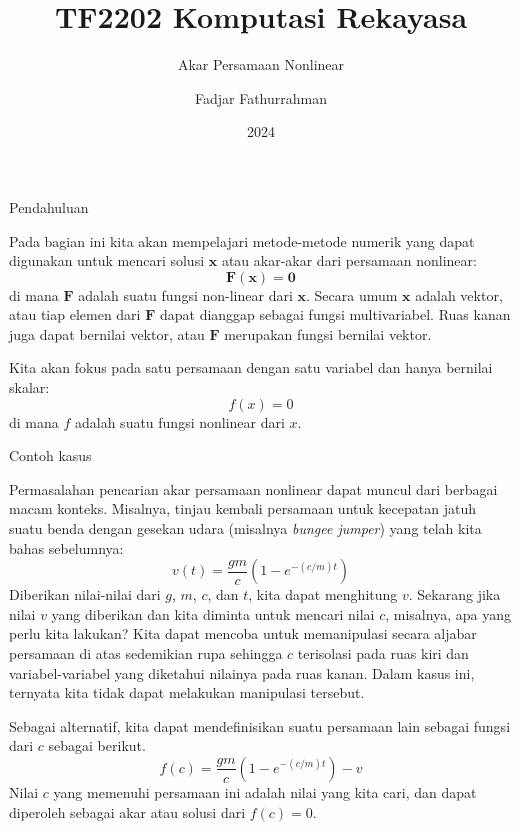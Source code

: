 

\title{TF2202 Komputasi Rekayasa}
\subtitle{Akar Persamaan Nonlinear}
\author{Fadjar Fathurrahman}
\date{2024}



\frame{\titlepage}

\begin{frame}{Pendahuluan}

Pada bagian ini kita akan mempelajari metode-metode numerik yang
dapat digunakan untuk mencari solusi $\mathbf{x}$ atau akar-akar
dari persamaan nonlinear:
$$
\mathbf{F}(\mathbf{x}) = \mathbf{0}
$$
di mana $\mathbf{F}$ adalah suatu fungsi non-linear dari $\mathbf{x}$.
Secara umum $\mathbf{x}$ adalah vektor, atau tiap elemen dari
$\mathbf{F}$ dapat dianggap sebagai
fungsi multivariabel. Ruas kanan juga dapat bernilai vektor, atau
$\mathbf{F}$ merupakan fungsi bernilai vektor.

Kita akan fokus pada satu persamaan dengan satu variabel dan hanya
bernilai skalar:
\begin{equation}
f(x) = 0
\label{eq:fx0}
\end{equation}
di mana $f$ adalah suatu fungsi nonlinear dari $x$.
\end{frame}


\begin{frame}{Contoh kasus}
\fontsize{9}{10}\selectfont

Permasalahan pencarian akar persamaan nonlinear dapat muncul dari berbagai
macam konteks. Misalnya, tinjau kembali persamaan untuk kecepatan
jatuh suatu benda dengan gesekan udara (misalnya \textit{bungee jumper})
yang telah kita bahas sebelumnya:
\begin{equation*}
v(t) = \frac{gm}{c}\left( 1 - e^{-(c/m)t} \right)
\end{equation*}
Diberikan nilai-nilai dari $g$, $m$, $c$, dan $t$, kita dapat menghitung
$v$. Sekarang jika nilai $v$ yang diberikan dan kita diminta untuk mencari
nilai $c$, misalnya, apa yang perlu kita lakukan? Kita dapat
mencoba untuk memanipulasi secara aljabar persamaan di atas sedemikian rupa sehingga
$c$ terisolasi pada ruas kiri dan variabel-variabel yang diketahui nilainya
pada ruas kanan. Dalam kasus ini, ternyata kita tidak dapat melakukan
manipulasi tersebut.

Sebagai alternatif, kita dapat mendefinisikan suatu persamaan lain sebagai fungsi
dari $c$ sebagai berikut.
$$
f(c) = \frac{gm}{c}\left( 1 - e^{-(c/m)t} \right) - v
$$
Nilai $c$ yang memenuhi persamaan ini adalah nilai yang kita cari, dan dapat
diperoleh sebagai akar atau solusi dari $f(c) = 0$.

\end{frame}

